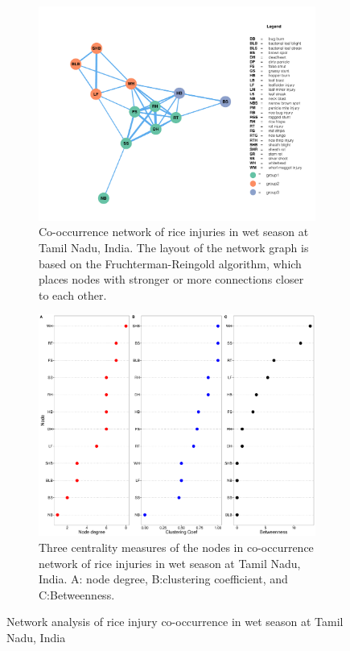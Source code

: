 \begin{figure}
    \centering
    \begin{subfigure}[b]{1\textwidth}
        \includegraphics[width = 1\textwidth]{figures/networkTM_ws/networkTM_ws.pdf}
        \caption{Co-occurrence network of rice injuries in wet season at Tamil Nadu, India. The layout of the network graph is based on the Fruchterman-Reingold algorithm, which places nodes with stronger or more connections closer to each other.}
        \label{fig:networkTM_ws}
    \end{subfigure}
    \begin{subfigure}[b]{1\textwidth}
        \includegraphics[width = 1\textwidth]{figures/nodepropTM_ws/nodepropTM_ws.pdf}
        \caption{Three centrality measures of the nodes in co-occurrence network of rice injuries in wet season at Tamil Nadu, India. A: node degree, B:clustering coefficient, and C:Betweenness.}
        \label{fig:nodepropTM_ws}
    \end{subfigure}
    \caption{Network analysis of rice injury co-occurrence in wet season at Tamil Nadu, India}
    \label{fig:TM_ws}
\end{figure}


